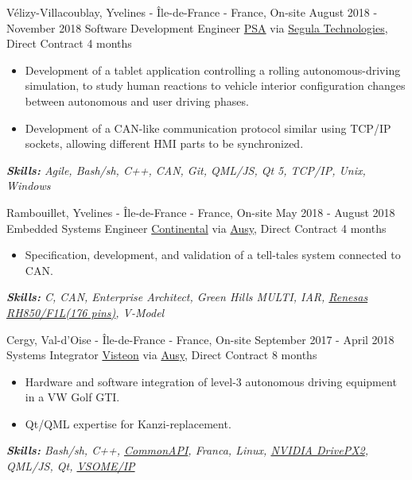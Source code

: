 \documentclass[11pt,a4paper,roman]{moderncv}
\begin{document}
\cventry
{Vélizy-Villacoublay, Yvelines - Île-de-France - France, On-site}
{August 2018 - November 2018}
{Software Development Engineer}
{\href{https://www.groupe-psa.com/en/}{PSA} via \href{https://www.segulatechnologies.com/en/}{Segula Technologies}, Direct Contract}
{4 months}
{}
{
\begin{itemize}
	\item Development of a tablet application controlling a rolling autonomous-driving simulation, to study human reactions to vehicle interior configuration changes between autonomous and user driving phases.
	\item Development of a CAN-like communication protocol similar using TCP/IP sockets, allowing different HMI parts to be synchronized.
\end{itemize}
{\textcolor{color2}{\textit{\textbf{Skills:}
	Agile,
	Bash/sh,
	C++,
	CAN,
	Git,
	QML/JS,
	Qt 5,
	TCP/IP,
	Unix,
	Windows
	\newline
}}}}


\cventry
{Rambouillet, Yvelines - Île-de-France - France, On-site}
{May 2018 - August 2018}
{Embedded Systems Engineer}
{\href{https://www.continental.com/en}{Continental} via \href{https://www.ausy.com/en}{Ausy}, Direct Contract}
{4 months}
{}
{
\begin{itemize}
	\item Specification, development, and validation of a tell-tales system connected to CAN.
\end{itemize}
{\textcolor{color2}{\textit{\textbf{Skills:}
	C,
	CAN,
	Enterprise Architect,
	Green Hills MULTI,
	IAR,
	\href{https://www.renesas.com/eu/en/products/microcontrollers-microprocessors/rh850/rh850f1x/rh850f1l.html}{Renesas RH850/F1L(176 pins)},
	V-Model
	\newline
}}}}


\cventry
{Cergy, Val-d'Oise - Île-de-France - France, On-site}
{September 2017 - April 2018}
{Systems Integrator}
{\href{https://www.visteon.com}{Visteon} via \href{https://www.ausy.com/en}{Ausy}, Direct Contract}
{8 months}
{}
{
\begin{itemize}
	\item Hardware and software integration of level-3 autonomous driving equipment in a VW Golf GTI.
	\item Qt/QML expertise for Kanzi-replacement.
\end{itemize}
{\textcolor{color2}{\textit{\textbf{Skills:}
	Bash/sh,
	C++,
	\href{https://github.com/GENIVI/capicxx-core-runtime}{CommonAPI},
	Franca,
	Linux,
	\href{https://www.nvidia.com/content/nvidiaGDC/sg/en_SG/self-driving-cars/drive-px/}{NVIDIA Drive\texttrademark PX2},
	QML/JS,
	Qt,
	\href{https://github.com/GENIVI/vsomeip}{VSOME/IP}
	\newline
}}}}
\end{document}
